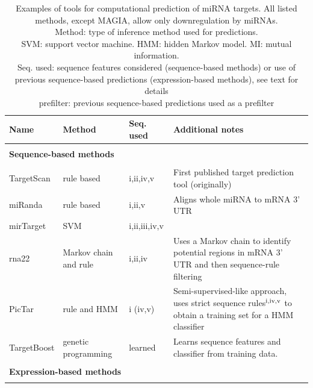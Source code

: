 \begin{table}
  \caption{Examples of tools for computational prediction of miRNA targets. All listed methods,
  except MAGIA, allow only downregulation by miRNAs. \\
  Method: type of inference method used for predictions. \\
  SVM: support vector machine. HMM: hidden Markov model. MI: mutual information. \\
  Seq. used: sequence features considered (sequence-based methods) or use of
  previous sequence-based predictions (expression-based methods), see text for details \\
  prefilter: previous sequence-based predictions used as a prefilter
  }
  \label{table:prediction-methods}
  {\fontsize{10pt}{13pt}\selectfont
  \begin{tabular}{ lp{3cm}lp{5cm} }
    \hline
    \textbf{Name} & \textbf{Method} & \textbf{Seq. used} & \textbf{Additional notes} \\
    \hline \\
    \multicolumn{4}{l}{\textbf{Sequence-based methods}} \\
    \\[-.3cm]
    TargetScan \citep{Agarwal2015}  & rule based            & i,ii,iv,v     & First published target prediction tool (originally) \\
    miRanda \citep{Betel2008}       & rule based            & i,ii,v        & Aligns whole miRNA to mRNA 3' UTR \\
    mirTarget \citep{Wang2008}      & SVM                   & i,ii,iii,iv,v &  \\
    rna22 \citep{Miranda2006}       & Markov chain and rule & i,ii,iv       & Uses a Markov chain to identify potential regions in mRNA 3' UTR and then sequence-rule filtering \\
    PicTar \citep{Krek2005}         & rule and HMM          & i (iv,v)      & Semi-supervised-like approach, uses strict sequence rules$^{\textup{i,iv,v}}$ to obtain a training set for a HMM classifier \\
    TargetBoost \citep{Saetrom2005} & genetic \mbox{programming} & learned  & Learns sequence features and classifier from training data. \\
    \\
    \multicolumn{4}{l}{\textbf{Expression-based methods}} \\
    \\[-.3cm]

\end{tabular}}
\end{table}
